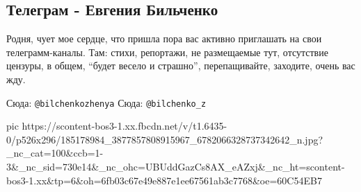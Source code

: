  
 
 
 
 
\subsection{Телеграм - Евгения Бильченко}

Родня, чует мое сердце, что пришла пора вас активно приглашать на свои
телеграмм-каналы. Там: стихи, репортажи, не размещаемые тут, отсутствие
цензуры, в общем, \enquote{будет весело и страшно}, перепащивайте, заходите, очень вас
жду. 

Сюда: \verb|@bilchenkozhenya|
Сюда: \verb|@bilchenko_z|

\ifcmt
  pic https://scontent-bos3-1.xx.fbcdn.net/v/t1.6435-0/p526x296/185178984_3877857808915967_6782066328737342642_n.jpg?_nc_cat=100&ccb=1-3&_nc_sid=730e14&_nc_ohc=UBUddGazCs8AX_eAZxj&_nc_ht=scontent-bos3-1.xx&tp=6&oh=6fb03c67e49e887e1ee67561ab3c7768&oe=60C54EB7
\fi

